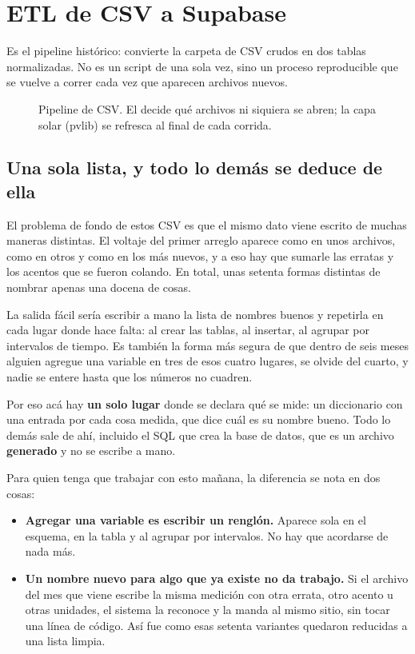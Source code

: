 \section{ETL de CSV a Supabase}

Es el pipeline histórico: convierte la carpeta de CSV crudos en dos tablas normalizadas.
No es un script de una sola vez, sino un proceso reproducible que se vuelve a correr
cada vez que aparecen archivos nuevos.

\begin{figure}[htbp]
\centering
\resizebox{\textwidth}{!}{}
\caption{Pipeline de CSV. El  decide qué archivos ni siquiera se abren;
la capa solar (pvlib) se refresca al final de cada corrida.}
\end{figure}

\subsection{Una sola lista, y todo lo demás se deduce de ella}

El problema de fondo de estos CSV es que el mismo dato viene escrito de muchas maneras
distintas. El voltaje del primer arreglo aparece como  en unos archivos, como
 en otros y como  en los más nuevos, y a eso hay
que sumarle las erratas y los acentos que se fueron colando. En total, unas setenta formas
distintas de nombrar apenas una docena de cosas.

La salida fácil sería escribir a mano la lista de nombres buenos y repetirla en cada lugar
donde hace falta: al crear las tablas, al insertar, al agrupar por intervalos de tiempo.
Es también la forma más segura de que dentro de seis meses alguien agregue una variable en
tres de esos cuatro lugares, se olvide del cuarto, y nadie se entere hasta que los números
no cuadren.

Por eso acá hay \textbf{un solo lugar} donde se declara qué se mide: un diccionario con
una entrada por cada cosa medida, que dice cuál es su nombre bueno. Todo lo demás sale de
ahí, incluido el SQL que crea la base de datos, que es un archivo \textbf{generado} y no
se escribe a mano.

Para quien tenga que trabajar con esto mañana, la diferencia se nota en dos cosas:

\begin{itemize}[leftmargin=*,itemsep=2pt]
  \item \textbf{Agregar una variable es escribir un renglón.} Aparece sola en el esquema,
    en la tabla y al agrupar por intervalos. No hay que acordarse de nada más.
  \item \textbf{Un nombre nuevo para algo que ya existe no da trabajo.} Si el archivo del
    mes que viene escribe la misma medición con otra errata, otro acento u otras unidades,
    el sistema la reconoce y la manda al mismo sitio, sin tocar una línea de código. Así
    fue como esas setenta variantes quedaron reducidas a una lista limpia.
\end{itemize}

